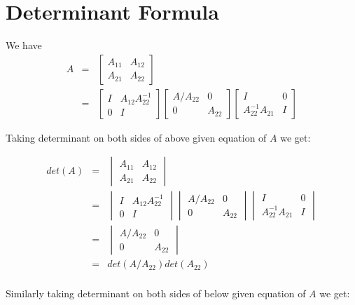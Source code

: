 \section{Determinant Formula}
We have 
\begin{eqnarray*} 
A & = & \begin{bmatrix} A_{11}&A_{12}\\ A_{21}&A_{22} \end{bmatrix}\\
  & = & \begin{bmatrix} I&A_{12}A^{-1}_{22}\\ 0&I \end{bmatrix}  \begin{bmatrix} A/A_{22}&0\\ 0&A_{22} \end{bmatrix}
        \begin{bmatrix} I&0\\ A^{-1}_{22}A_{21}&I \end{bmatrix}
\end{eqnarray*}

Taking determinant on both sides of above given equation of $A$ we get:

\begin{eqnarray*}
det(A) & = & \begin {vmatrix} A_{11}&A_{12}\\ A_{21}&A_{22} \end{vmatrix}\\
       & =& \begin{vmatrix} I&A_{12}A^{-1}_{22}\\ 0&I \end{vmatrix} \begin{vmatrix} A/A_{22}&0\\ 0&A_{22} \end{vmatrix}
             \begin{vmatrix} I&0\\ A^{-1}_{22}A_{21}&I \end{vmatrix}\\
       & = & \begin{vmatrix}A/A_{22}&0\\ 0&A_{22}\end{vmatrix}\\
       & = & det(A/A_{22})det(A_{22})\\ 
\end{eqnarray*}

Similarly taking determinant on both sides of below given equation of $A$ we get:


